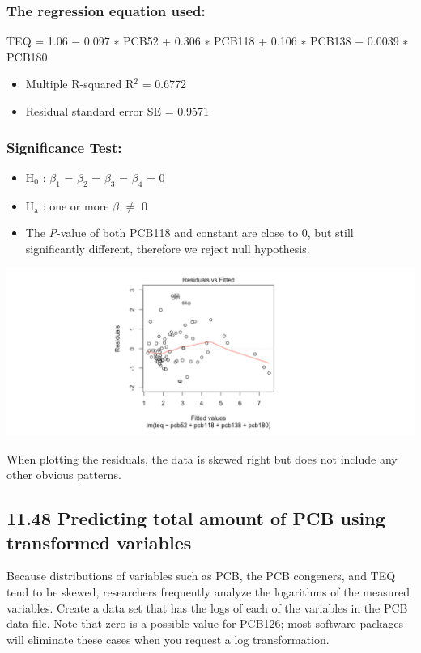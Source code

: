 \documentclass[11pt]{article}
\begin{document}
\subsubsection*{The regression equation used:}
\label{sec:org6f2d1cc}
TEQ = 1.06 − 0.097 ∗ PCB52 + 0.306 ∗ PCB118 + 0.106 ∗ PCB138 − 0.0039 ∗ PCB180
\begin{itemize}
\item Multiple R-squared R\(^{\text{2}}\) = 0.6772
\item Residual standard error SE = 0.9571
\end{itemize}

\subsubsection*{Significance Test:}
\label{sec:org1884ba3}
\begin{itemize}
\item H\(_{\text{0}}\) : \(\beta_{\text{1}}\) = \(\beta_{\text{2}}\) = \(\beta_{\text{3}}\) = \(\beta_{\text{4}}\) = 0
\item H\(_{\text{a}}\) : one or more \(\beta\) \(\neq\) 0
\item The \emph{P}-value of both PCB118 and constant are close to 0, but still significantly different, therefore we reject null hypothesis.
\end{itemize}

\begin{center}
\includegraphics[width=.9\linewidth]{./graphs/image7.png}
\end{center}
When plotting the residuals, the data is skewed right but does not include any other obvious patterns. 

\subsection*{11.48 Predicting total amount of PCB using transformed variables}
\label{sec:org2a46002}
Because distributions of variables such as PCB, the PCB congeners, and TEQ tend to be skewed, researchers frequently analyze the logarithms of the measured variables. Create a data set that has the logs of each of the variables in the PCB data file. Note that zero is a possible value for PCB126; most software packages will eliminate these cases when you request a log transformation.
\end{document}
